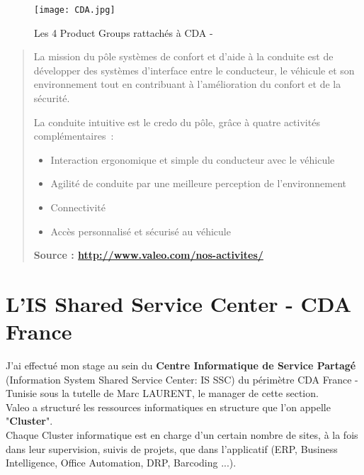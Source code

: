  \begin{figure}[H]
    \centering
    \texttt{[image: CDA.jpg]}
	\caption{Les 4 Product Groups rattachés à CDA - \cite{image.cda.source} }\label{image.cda} 
\end{figure}

\begin{quotation}
\begin{itshape}
La mission du pôle systèmes de confort et d’aide à la conduite est de développer des systèmes d’interface entre le conducteur, le véhicule et son environnement tout en contribuant à l’amélioration du confort et de la sécurité.\\
	\vspace{3mm}
	
La conduite intuitive est le credo du pôle, grâce à quatre activités complémentaires~: \\
	\begin{itemize}
		\item Interaction ergonomique et simple du conducteur avec le véhicule
		\item Agilité de conduite par une meilleure perception de l’environnement
		\item Connectivité
		\item Accès personnalisé et sécurisé au véhicule
	\end{itemize}
\end{itshape}
\textbf{Source : \url{http://www.valeo.com/nos-activites/}}

\end{quotation}

\clearpage
\section{L'IS Shared Service Center - CDA France}

J'ai effectué mon stage au sein du \textbf{Centre Informatique de Service Partagé} (Information System Shared Service Center: IS SSC) du périmètre CDA France - Tunisie sous la tutelle de Marc LAURENT, le manager de cette section.\\

Valeo a structuré les ressources informatiques en structure que l'on appelle "\textbf{Cluster}".\\

Chaque Cluster informatique est en charge d'un certain nombre de sites, à la fois dans leur supervision, suivis de projets, que dans l'applicatif (ERP, Business Intelligence, Office Automation, DRP, Barcoding ...).

